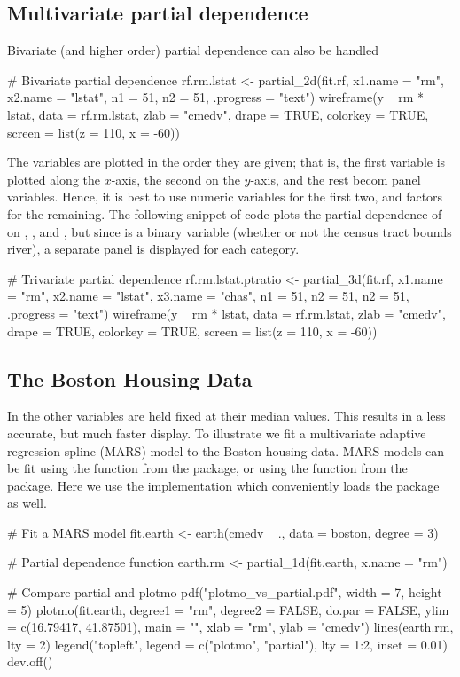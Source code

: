 \subsection{Multivariate partial dependence}

Bivariate (and higher order) partial dependence can also be handled

\begin{example}
# Bivariate partial dependence
rf.rm.lstat <- partial_2d(fit.rf, x1.name = "rm", x2.name = "lstat", 
                          n1 = 51, n2 = 51, .progress = "text")
wireframe(y ~ rm * lstat, data = rf.rm.lstat, zlab = "cmedv", drape = TRUE, 
          colorkey = TRUE, screen = list(z = 110, x = -60))
\end{example}

The variables are plotted in the order they are given; that is, the first variable is plotted along the $x$-axis, the second on the $y$-axis, and the rest becom panel variables. Hence, it is best to use numeric variables for the first two, and factors for the remaining. The following snippet of code plots the partial dependence of  on , , and , but since  is a binary variable (whether or not the census tract bounds river), a separate panel is displayed for each category.
\begin{example}
# Trivariate partial dependence
rf.rm.lstat.ptratio <- partial_3d(fit.rf, x1.name = "rm", x2.name = "lstat", 
                                  x3.name = "chas", n1 = 51, n2 = 51, n2 = 51, 
                                  .progress = "text")
wireframe(y ~ rm * lstat, data = rf.rm.lstat, zlab = "cmedv", drape = TRUE, 
          colorkey = TRUE, screen = list(z = 110, x = -60))
\end{example}

\subsection{The Boston Housing Data}

In  the other variables are held fixed at their median values. This results in a less accurate, but much faster display. To illustrate we fit a multivariate adaptive regression spline (MARS) model to the Boston housing data. MARS models can be fit using the  function from the  package, or using the  function from the  package. Here we use the  implementation which conveniently loads the  package as well.
\begin{example}
# Fit a MARS model
fit.earth <- earth(cmedv ~ ., data = boston, degree = 3)

# Partial dependence function
earth.rm <- partial_1d(fit.earth, x.name = "rm")

# Compare partial and plotmo
pdf("plotmo_vs_partial.pdf", width = 7, height = 5)
plotmo(fit.earth, degree1 = "rm", degree2 = FALSE, do.par = FALSE, 
       ylim = c(16.79417, 41.87501), main = "", xlab = "rm", ylab = "cmedv")
lines(earth.rm, lty = 2)
legend("topleft", legend = c("plotmo", "partial"),
       lty = 1:2, inset = 0.01)
dev.off()
\end{example}

